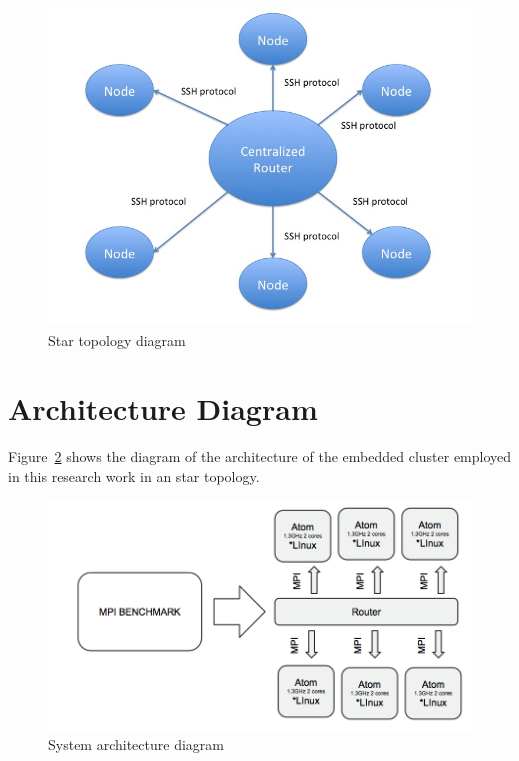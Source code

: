 \begin{figure}[H]
\centering
\includegraphics[width=1\textwidth]{images/star_topology.png}
\caption{Star topology diagram}
\label{fig:4.3}
\end{figure}


\section{Architecture Diagram}

Figure~\ref{fig:4.4} shows the diagram of the architecture of the embedded
cluster employed in this research work in an star topology. 

\begin{figure}[H]
\centering
\includegraphics[width=1\textwidth]{images/cluster_minnows.png}
\caption{System architecture diagram }
\label{fig:4.4}
\end{figure}

\noindent

\clearpage
